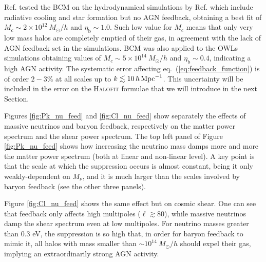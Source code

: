 \documentclass[a4paper,11pt]{article}
\def\kMpc{\, h \, {\rm Mpc}^{-1}}
\newcommand{\eq}[1]{eq.~(\ref{#1})}
\begin{document}
{Ref. \cite{Schneider+15} tested the BCM on the hydrodynamical simulations by Ref. \cite{Jing+05} which include radiative cooling and star formation but no AGN feedback, obtaining a best fit of $M_c \sim 2 \times 10^{12} \ M_\odot/h$ and $\eta_\mathrm b \sim 1.0$.
Such low value for $M_c$ means that only very low mass halos are completely emptied of their gas, in agreement with the lack of AGN feedback set in the simulations.
BCM was also applied to the OWLs simulations \cite{Van_Daalen-feedback+11} obtaining values of $M_c \sim 5 \times 10^{14} \ M_\odot/h$ and $\eta_\mathrm b \sim 0.4$, indicating a high AGN activity. The systematic error affecting \eq{eq:feedback_function} is of order $2-3$\% at all scales up to $k\lesssim 10 \kMpc$.
This uncertainty will be included in the error on the \textsc{Halofit} formulae that we will introduce in the next Section.

Figures \ref{fig:Pk_nu_feed} and \ref{fig:Cl_nu_feed} show separately the effects of massive neutrinos and baryon feedback, respectively on the matter power spectrum and the shear power spectrum.
The top left panel of Figure \ref{fig:Pk_nu_feed} shows how increasing the neutrino mass damps more and more the matter power spectrum (both at linear and non-linear level).
A key point is that the scale at which the suppression occurs is almost constant, being it only weakly-dependent on $M_\nu$, and it is much larger than the scales involved by baryon feedback (see the other three panels).

Figure \ref{fig:Cl_nu_feed} shows the same effect but on cosmic shear. 
One can see that feedback only affects high multipoles ($\ell\gtrsim 80$), while massive neutrinos damp the shear spectrum even at low multipoles.
For neutrino masses greater than 0.3 eV, the suppression is so high that, in order for baryon feedback to mimic it, all halos with mass smaller than $\sim 10^{14} \ M_\odot/h$ should expel their gas, implying an extraordinarily strong AGN activity.

}
\end{document}
